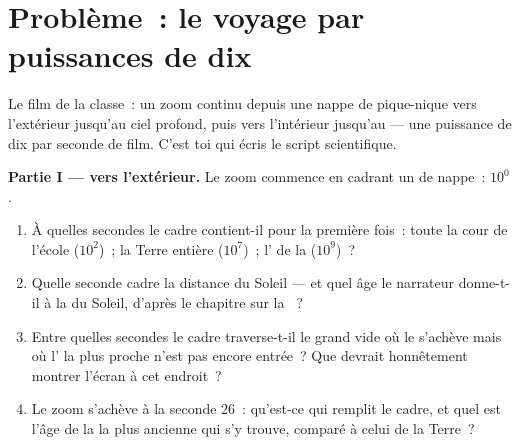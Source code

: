 \section{Problème~: le voyage par puissances de dix}

\begin{problem}\label{pb:g9:atoms-to-galaxies:1}
Le film de la classe~: un zoom continu depuis une nappe de
pique-nique vers l'extérieur jusqu'au ciel profond, puis vers
l'intérieur jusqu'au  --- une puissance de dix par seconde de
film. C'est toi qui écris le script scientifique.

\medskip\noindent\textbf{Partie I --- vers l'extérieur.}
Le zoom commence en cadrant un  de nappe~: $10^{0}$.
\begin{enumerate}
  \item À quelles secondes le cadre contient-il pour la première
        fois~: toute la cour de l'école ($10^{2}$)~; la Terre
        entière ($10^{7}$)~; l' de la  ($10^{9}$)~?
  \item Quelle seconde cadre la distance du Soleil --- et quel âge
        le narrateur donne-t-il à la  du Soleil, d'après le
        chapitre sur la ~?
  \item Entre quelles secondes le cadre traverse-t-il le grand vide
        où le  s'achève mais où l' la plus
        proche n'est pas encore entrée~? Que devrait honnêtement
        montrer l'écran à cet endroit~?
  \item Le zoom s'achève à la seconde $26$~: qu'est-ce qui remplit
        le cadre, et quel est l'âge de la  la plus ancienne
        qui s'y trouve, comparé à celui de la Terre~?
\end{enumerate}


\end{problem}
